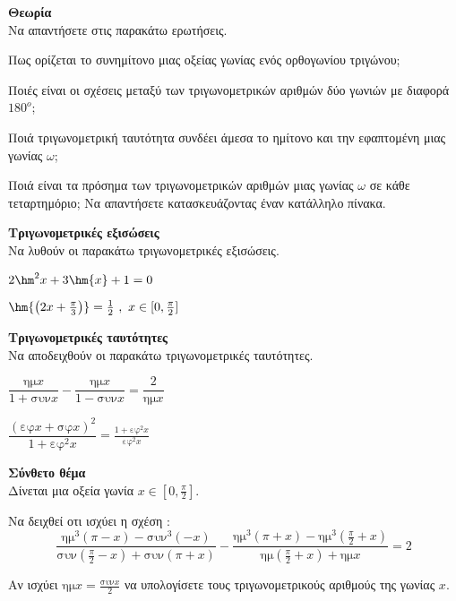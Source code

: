 \documentclass[ektypwsh]{diag-xelatex}
\begin{document}
\begin{thema}
\item \textbf{Θεωρία}\\
Να απαντήσετε στις παρακάτω ερωτήσεις.
\begin{rlist}
\item Πως ορίζεται το συνημίτονο μιας οξείας γωνίας ενός ορθογωνίου τριγώνου;
\item Ποιές είναι οι σχέσεις μεταξύ των τριγωνομετρικών αριθμών δύο γωνιών με διαφορά $ 180^o $;
\item Ποιά τριγωνομετρική ταυτότητα συνδέει άμεσα το ημίτονο και την εφαπτομένη μιας γωνίας $ \omega $;
\item Ποιά είναι τα πρόσημα των τριγωνομετρικών αριθμών μιας γωνίας $ \omega $ σε κάθε τεταρτημόριο; Να απαντήσετε κατασκευάζοντας έναν κατάλληλο πίνακα.
\end{rlist}
\item \textbf{Τριγωνομετρικές εξισώσεις}\\
Να λυθούν οι παρακάτω τριγωνομετρικές εξισώσεις.
\begin{rlist}
\item $ 2\hm^2{x}+3\hm{x}+1=0 $
\item $ \hm{\left( 2x+\frac{\pi}{3}\right) }=\frac{1}{2}\ ,\ x\in[0,\frac{\pi}{2}] $
\end{rlist}
\item \textbf{Τριγωνομετρικές ταυτότητες}\\
Να αποδειχθούν οι παρακάτω τριγωνομετρικές ταυτότητες.
\begin{multicols}{2}
\begin{rlist}
\item $ \dfrac{\textrm{ημ}{x}}{1+\textrm{συν}{x}}-\dfrac{\textrm{ημ}{x}}{1-\textrm{συν}{x}}=\dfrac{2}{\textrm{ημ}{x}} $
\item $ \dfrac{\left( \textrm{εφ}{x}+\textrm{σφ}{x}\right)^2 }{1+\textrm{εφ}^2{x}}=\frac{1+\textrm{εφ}^2{x}}{\textrm{εφ}^2{x}} $
\end{rlist}
\end{multicols}
\item \textbf{Σύνθετο θέμα}\\
Δίνεται μια οξεία γωνία $ x\in\left[0,\frac{\pi}{2}\right]  $.
\begin{rlist}
\item Να δειχθεί οτι ισχύει η σχέση :
\[ \dfrac{\textrm{ημ}^3{\left( \pi-x\right) }-\textrm{συν}^3{\left( -x\right) }}{\textrm{συν}{\left( \frac{\pi}{2}-x\right) }+\textrm{συν}{\left( \pi+x\right) }}-\dfrac{\textrm{ημ}^3{\left( \pi+x\right) }-\textrm{ημ}^3{\left(\frac{\pi}{2}+x\right) }}{\textrm{ημ}{\left( \frac{\pi}{2}+x\right) }+\textrm{ημ}{x}}=2 \]
\item Αν ισχύει $ \textrm{ημ}{x}=\frac{\textrm{συν}{x}}{2} $ να υπολογίσετε τους τριγωνομετρικούς αριθμούς της γωνίας $ x $.
\end{rlist}
\end{thema}
\kaliepityxia
\end{document}
